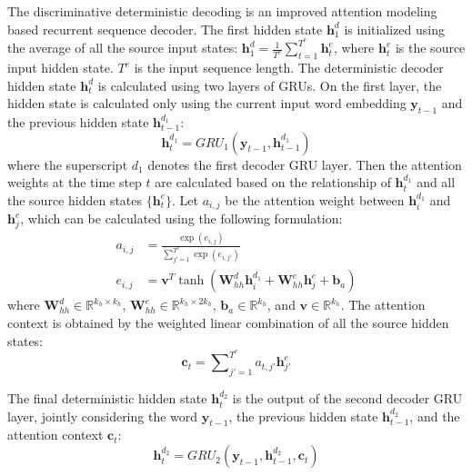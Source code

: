 \documentclass[11pt,letterpaper]{article}
\begin{document}
The discriminative deterministic decoding is an improved attention modeling based recurrent sequence decoder. The first hidden state $\mathbf{h}_1^d$ is initialized using the average of all the source input states: $
\mathbf{h}_1^d = \frac{1}{{{T^e}}}\sum\limits_{t = 1}^{{T^e}} {\mathbf{h}_t^e}$,
where $\mathbf{h}_t^e$ is the source input hidden state. $T^e$ is the input sequence length.
The deterministic decoder hidden state $\mathbf{h}_t^d$ is calculated using two layers of GRUs.
On the first layer, the hidden state is calculated only using the current input word embedding $\mathbf{y}_{t-1}$ and the  previous hidden state $\mathbf{h}_{t-1}^{d_1}$:
\begin{equation}
\mathbf{h}_t^{d_1} = GRU_1(\mathbf{y}_{t-1}, \mathbf{h}_{t-1}^{d_1})
\end{equation}
where the superscript $d_1$ denotes the first decoder GRU layer.
Then the attention weights at the time step $t$ are calculated based on the relationship of $\mathbf{h}_t^{d_1}$ and all the source hidden states $\{\mathbf{h}_t^e\}$. Let $a_{i,j}$ be the attention weight between $\mathbf{h}_i^{d_1}$ and $\mathbf{h}_j^{e}$, which can be calculated using the following formulation:
\[
\begin{aligned}
{a_{i,j}} &= \frac{{\exp ({e_{i,j}})}}{{\sum\nolimits_{j' = 1}^{{T^e}} {\exp ({e_{i,j'}})} }}\\
{e_{i,j}} &= {\mathbf{v}^T}\tanh (\mathbf{W}_{hh}^d\mathbf{h}_i^{{d_1}} + \mathbf{W}_{hh}^e\mathbf{h}_j^e + {\mathbf{b}_a})
\end{aligned}
\]
where $\mathbf{W}_{hh}^d \in \mathbb{R}^{k_h \times k_h}$, $\mathbf{W}_{hh}^e \in \mathbb{R}^{k_h \times 2k_h}$, $\mathbf{b}_a \in \mathbb{R}^{k_h}$, and $\mathbf{v} \in \mathbb{R}^{k_h}$.
The attention context is obtained by the weighted linear combination of all the source hidden states:
\begin{equation}
{\mathbf{c}_t} = \sum\nolimits_{j' = 1}^{{T^e}} {{a_{t,j'}}\mathbf{h}_{j'}^e} 
\end{equation}

The final deterministic hidden state $\mathbf{h}_t^{d_2}$ is the output of the second decoder GRU layer, jointly considering the word $\mathbf{y}_{t-1}$, the previous hidden state $\mathbf{h}_{t-1}^{d_2}$, and the attention context $\mathbf{c}_t$:
\begin{equation}
\mathbf{h}_t^{d_2} = GRU_2(\mathbf{y}_{t-1}, \mathbf{h}_{t-1}^{d_2}, \mathbf{c}_t)
\end{equation}
\end{document}
